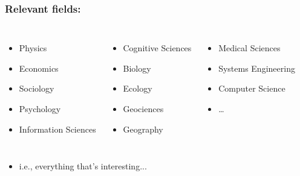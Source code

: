 \begin{frame}
  \frametitle{Relevant fields:}

  \begin{block}{}
    \begin{columns}
      \begin{itemize}
      \item 
        Physics
      \item 
        Economics
      \item 
        Sociology
      \item 
        Psychology
      \item 
        Information Sciences
      \end{itemize}
      \begin{itemize}
      \item 
        Cognitive Sciences
      \item 
        Biology
      \item 
        Ecology
      \item 
        Geociences
      \item 
        Geography
      \end{itemize}
      \begin{itemize}
      \item 
        Medical Sciences
      \item 
        Systems Engineering
      \item 
        Computer Science
      \item 
      \ldots
      \end{itemize}
    \end{columns}
  \end{block}

  \begin{itemize}
  \item<+->
    i.e., everything that's interesting...
  \end{itemize}

\end{frame}

